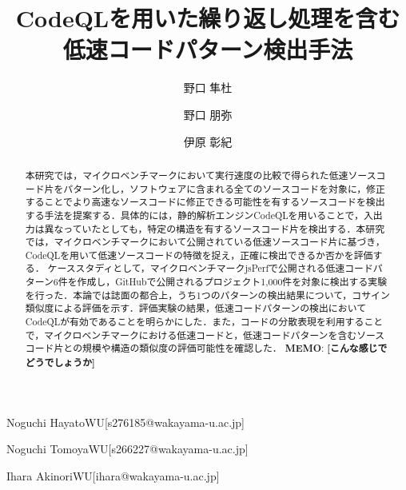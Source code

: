 \documentclass[submit,techrep,noauthor]{ipsj}
\newcommand{\todo}[1]{\colorbox{yellow}{{\bf TODO}:}{\color{red} {\textbf{[#1]}}}}
\newcommand{\memo}[1]{\colorbox{magenta!30}{{\bf MEMO}:}{\color{red!50} {\textbf{[#1]}}}}
\begin{document}
\title{CodeQLを用いた繰り返し処理を含む
\\
低速コードパターン検出手法
}


\author{野口 隼杜}{Noguchi Hayato}{WU}[s276185@wakayama-u.ac.jp]
\author{野口 朋弥}{Noguchi Tomoya}{WU}[s266227@wakayama-u.ac.jp]
\author{伊原 彰紀}{Ihara Akinori}{WU}[ihara@wakayama-u.ac.jp]

\begin{abstract}
本研究では，マイクロベンチマークにおいて実行速度の比較で得られた低速ソースコード片をパターン化し，ソフトウェアに含まれる全てのソースコードを対象に，修正することでより高速なソースコードに修正できる可能性を有するソースコードを検出する手法を提案する．具体的には，静的解析エンジンCodeQLを用いることで，入出力は異なっていたとしても，特定の構造を有するソースコード片を検出する．本研究では，マイクロベンチマークにおいて公開されている低速ソースコード片に基づき，CodeQLを用いて低速ソースコードの特徴を捉え，正確に検出できるか否かを評価する．
ケーススタディとして，マイクロベンチマークjsPerfで公開される低速コードパターン6件を作成し，GitHubで公開されるプロジェクト1,000件を対象に検出する実験を行った．本論では誌面の都合上，うち1つのパターンの検出結果について，コサイン類似度による評価を示す．評価実験の結果，低速コードパターンの検出においてCodeQLが有効であることを明らかにした．また，コードの分散表現を利用することで，マイクロベンチマークにおける低速コードと，低速コードパターンを含むソースコード片との規模や構造の類似度の評価可能性を確認した．
\memo{こんな感じでどうでしょうか}

\end{abstract}
\end{document}
